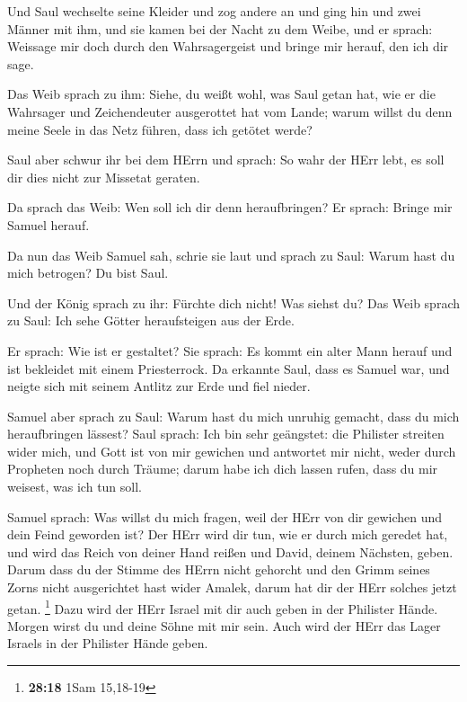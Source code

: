  Und Saul wechselte seine Kleider und zog andere an und
ging hin und zwei Männer mit ihm, und sie kamen bei der Nacht zu dem
Weibe, und er sprach: Weissage mir doch durch den Wahrsagergeist und
bringe mir herauf, den ich dir sage.

 Das Weib sprach zu ihm: Siehe, du weißt wohl, was Saul
getan hat, wie er die Wahrsager und Zeichendeuter ausgerottet hat vom
Lande; warum willst du denn meine Seele in das Netz führen, dass ich
getötet werde?

 Saul aber schwur ihr bei dem HErrn und sprach: So wahr
der HErr lebt, es soll dir dies nicht zur Missetat geraten.

 Da sprach das Weib: Wen soll ich dir denn heraufbringen?
Er sprach: Bringe mir Samuel herauf.

 Da nun das Weib Samuel sah, schrie sie laut und sprach
zu Saul: Warum hast du mich betrogen? Du bist Saul.

 Und der König sprach zu ihr: Fürchte dich nicht! Was
siehst du? Das Weib sprach zu Saul: Ich sehe Götter heraufsteigen aus
der Erde.

 Er sprach: Wie ist er gestaltet? Sie sprach: Es kommt
ein alter Mann herauf und ist bekleidet mit einem Priesterrock. Da
erkannte Saul, dass es Samuel war, und neigte sich mit seinem Antlitz
zur Erde und fiel nieder.

 Samuel aber sprach zu Saul: Warum hast du mich unruhig
gemacht, dass du mich heraufbringen lässest? Saul sprach: Ich bin sehr
geängstet: die Philister streiten wider mich, und Gott ist von mir
gewichen und antwortet mir nicht, weder durch Propheten noch durch
Träume; darum habe ich dich lassen rufen, dass du mir weisest, was ich
tun soll.

 Samuel sprach: Was willst du mich fragen, weil der HErr
von dir gewichen und dein Feind geworden ist?  Der HErr
wird dir tun, wie er durch mich geredet hat, und wird das Reich von
deiner Hand reißen und David, deinem Nächsten, geben. 
Darum dass du der Stimme des HErrn nicht gehorcht und den Grimm seines
Zorns nicht ausgerichtet hast wider Amalek, darum hat dir der HErr
solches jetzt getan. \footnote{\textbf{28:18} 1Sam 15,18-19}
 Dazu wird der HErr Israel mit dir auch geben in der
Philister Hände. Morgen wirst du und deine Söhne mit mir sein. Auch wird
der HErr das Lager Israels in der Philister Hände geben.

